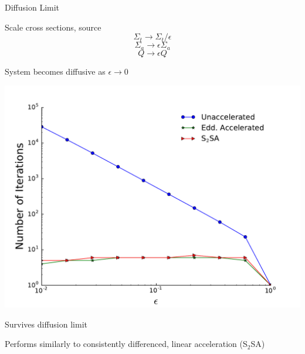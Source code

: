 \documentclass[10pt]{beamer}
\begin{document}
\begin{frame}{Diffusion Limit}

	\footnotesize
	Scale cross sections, source 
	$$\Sigma_t \rightarrow \Sigma_t/\epsilon $$
	$$\Sigma_a \rightarrow \epsilon \Sigma_a$$
	$$Q \rightarrow \epsilon Q$$ 

	System becomes diffusive as $\epsilon \rightarrow 0$ 

	\pause
	\centerline{\includegraphics[width=.5\paperwidth]{figs/diffLimit.pdf}}

	\pause
	Survives diffusion limit 

	\pause
	Performs similarly to consistently differenced, linear acceleration (S$_2$SA)

\end{frame}
\end{document}
